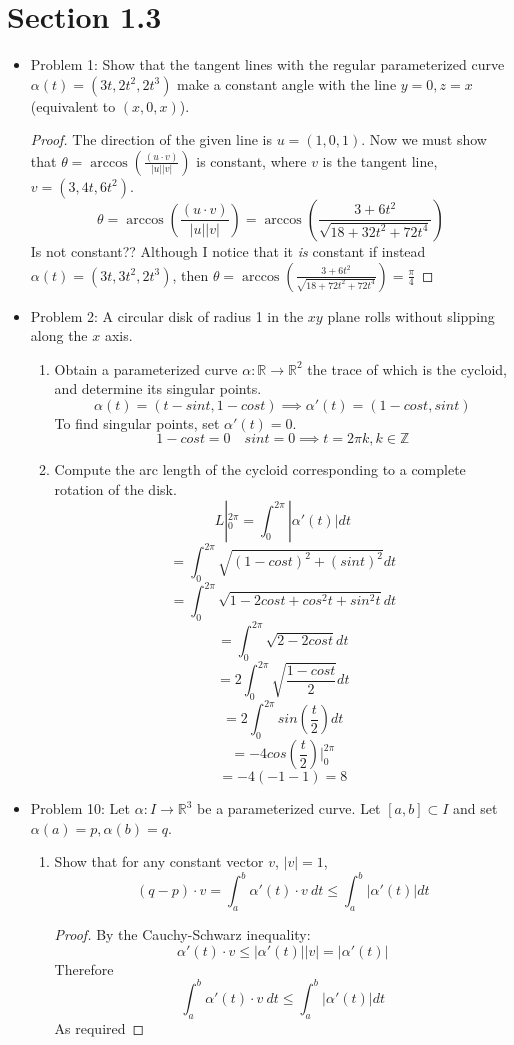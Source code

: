 \documentclass[a4paper,17pt]{extarticle}
\theoremstyle{definition}
\newcommand{\R}{\mathbb{R}}
\newcommand{\Z}{\mathbb{Z}}
\begin{document}
\section{Section 1.3}
\begin{itemize}
    \item Problem 1: Show that the tangent lines with the regular parameterized curve $\alpha(t)=(3t,2t^2,2t^3)$ make a constant angle with the line $y=0, z=x$ (equivalent to $(x,0,x)$).\begin{proof}The direction of the given line is $u=(1,0,1)$. Now we must show that $\theta=\arccos\left(\frac{(u\cdot v)}{|u||v|}\right)$ is constant, where $v$ is the tangent line, $v=(3,4t,6t^2)$. $$\theta=\arccos\left(\frac{(u\cdot v)}{|u||v|}\right)=\arccos\left(\frac{3+6t^2}{\sqrt{18+32t^2+72t^4}}\right)$$ Is not constant?? Although I notice that it \emph{is} constant if instead $\alpha(t)=(3t,3t^2,2t^3)$, then $\theta=\arccos\left(\frac{3+6t^2}{\sqrt{18+72t^2+72t^4}}\right)=\frac{\pi}{4}$
    \end{proof}
    \item Problem 2: A circular disk of radius 1 in the $xy$ plane rolls without slipping along the $x$ axis.\begin{enumerate}[label=\alph*.]
        \item Obtain a parameterized curve $\alpha:\R\to\R^2$ the trace of which is the cycloid, and determine its singular points. $$\alpha(t)=(t-sint,1-cost)\implies \alpha'(t)=(1-cost,sint)$$ To find singular points, set $\alpha'(t)=0$. $$1-cost=0\quad sint=0\implies t=2\pi k,k\in\Z$$
        \item Compute the arc length of the cycloid corresponding to a complete rotation of the disk. $$L|_0^{2\pi}=\int_{0}^{2\pi}|\alpha'(t)|dt$$ $$=\int_{0}^{2\pi}\sqrt{(1-cost)^2+(sint)^2}dt$$ $$=\int_{0}^{2\pi}\sqrt{1-2cost+cos^2t+sin^2t}dt$$ $$=\int_{0}^{2\pi}\sqrt{2-2cost}dt$$ $$=2\int_{0}^{2\pi}\sqrt{\frac{1-cost}{2}}dt$$ $$=2\int_{0}^{2\pi}sin\left(\frac{t}{2}\right)dt$$ $$=-4cos\left(\frac{t}{2}\right)|_{0}^{2\pi}$$ $$=-4(-1-1)=8$$
    \end{enumerate}
    \item Problem 10: Let $\alpha:I\to\R^3$ be a parameterized curve. Let $[a,b]\subset I$ and set $\alpha(a)=p,\alpha(b)=q$.\begin{enumerate}[label=\alph*.]
        \item Show that for any constant vector $v$, $|v|=1$, $$(q-p)\cdot v=\int_{a}^b\alpha'(t)\cdot v\ dt\leq\int_{a}^b|\alpha'(t)|dt$$\begin{proof}By the Cauchy-Schwarz inequality: $$\alpha'(t)\cdot v\leq|\alpha'(t)||v|=|\alpha'(t)|$$ Therefore $$\int_{a}^b\alpha'(t)\cdot v\ dt\leq\int_{a}^b|\alpha'(t)|dt$$ As required\end{proof}

\end{enumerate}
\end{itemize}
\end{document}
